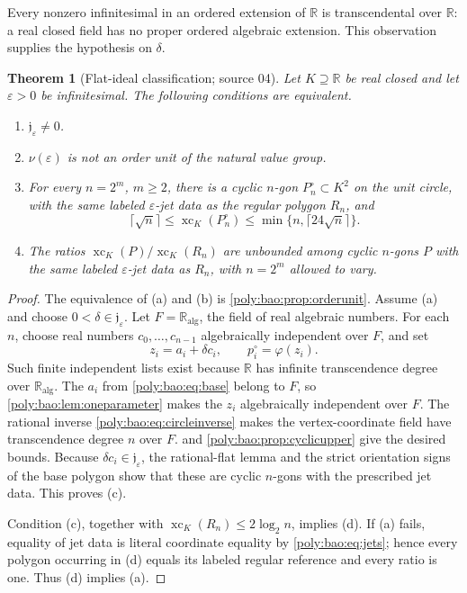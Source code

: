 \documentclass[11pt,a4paper]{article}
\numberwithin{equation}{section}
\newtheorem{theorem}{Theorem}[section]
\theoremstyle{plain}
\newcommand{\R}{\mathbb R}
\newcommand{\eps}{\varepsilon}
\newcommand{\A}{\mathbb R_{\mathrm{alg}}}
\newcommand{\xc}{\operatorname{xc}}
\newcommand{\ph}{\varphi}
\newcommand{\JJ}{\mathfrak j}
\begin{document}
Every nonzero infinitesimal in an ordered extension of $\R$ is
transcendental over $\R$: a real closed field has no proper ordered
algebraic extension. This observation supplies the hypothesis on $\delta$.

\begin{theorem}[Flat-ideal classification; source 04]\label{poly:bao:thm:criterion}
Let $K\supseteq\R$ be real closed and let $\eps>0$ be infinitesimal.
The following conditions are equivalent.
\begin{enumerate}[label=\textup{(\alph*)}]
\item $\JJ_\eps\neq0$.
\item $\nu(\eps)$ is not an order unit of the natural value group.
\item For every $n=2^m$, $m\geq2$, there is a cyclic $n$-gon $P^\circ_n\subset K^2$
on the unit circle, with the same labeled $\eps$-jet data as the regular
polygon $R_n$, and
\[
 \lceil\sqrt n\rceil\leq\xc_K(P^\circ_n)
 \leq\min\{n,\lceil24\sqrt n\rceil\}.
\]
\item The ratios $\xc_K(P)/\xc_K(R_n)$ are unbounded among cyclic
$n$-gons $P$ with the same labeled $\eps$-jet data as $R_n$, with
$n=2^m$ allowed to vary.
\end{enumerate}
\end{theorem}
\begin{proof}
The equivalence of (a) and (b) is \cref{poly:bao:prop:orderunit}. Assume (a) and
choose $0<\delta\in\JJ_\eps$. Let $F=\A$, the field of real algebraic
numbers. For each $n$, choose real numbers $c_0,\ldots,c_{n-1}$ algebraically
independent over $F$, and set
\[
 z_i=a_i+\delta c_i,\qquad p^\circ_i=\ph(z_i).
\]
Such finite independent lists exist because $\R$ has infinite
transcendence degree over $\A$. The $a_i$ from \eqref{poly:bao:eq:base} belong to
$F$, so \cref{poly:bao:lem:oneparameter} makes the $z_i$ algebraically independent
over $F$. The rational inverse \eqref{poly:bao:eq:circleinverse} makes the
vertex-coordinate field have transcendence degree $n$ over $F$.
 and \cref{poly:bao:prop:cyclicupper} give the desired bounds.
Because $\delta c_i\in\JJ_\eps$, the rational-flat lemma and the strict
orientation signs of the base polygon show that these are cyclic
$n$-gons with the prescribed jet data. This proves (c).

Condition (c), together with $\xc_K(R_n)\leq2\log_2 n$, implies (d).
If (a) fails, equality of jet data is literal coordinate equality by
\eqref{poly:bao:eq:jets}; hence every polygon occurring in (d) equals its labeled
regular reference and every ratio is one. Thus (d) implies (a).
\end{proof}
\end{document}
